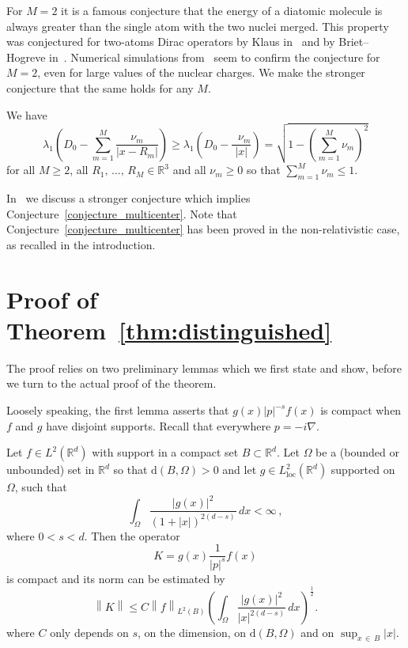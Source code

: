 \documentclass[AHL,Unicode,published]{cedram}
\newcommand{\R}{\mathbb{R}}
\newcommand{\rmd}{\mathrm{d}}
\DeclareMathOperator{\loc}{loc}
\newcommand\1{{\ensuremath {\mathds 1} }}
\newcommand{\ii}{\infty}
\newcommand{\norm}[1]{ \left\| #1 \right\|}
\renewcommand{\geq}{\geqslant}
\renewcommand{\leq}{\leqslant}
\begin{document}
For $M=2$ it is a famous conjecture that the energy of a diatomic molecule is always greater than the single atom with the two nuclei merged. This property was conjectured for two-atoms Dirac operators by Klaus in~\cite[p.~478]{Klaus-80b} and by Briet--Hogreve in~\cite[Section~2.4]{BriHog-03}. Numerical simulations from~\cite{ArtSurIndPluSto-10,McConnell-13} seem to confirm the conjecture for $M=2$, even for large values of the nuclear charges. We make the stronger conjecture that the same holds for any $M$.

\begin{conjecture}\label{conjecture_multicenter}
We have
\begin{equation}
\lambda_1\left(D_0-\sum_{m=1}^M\frac{\nu_m}{\left|x-R_m\right|}\right)\geq \lambda_1\left(D_0-\frac{\mathop{\sum\limits_{m=1}^M}\nu_m}{|x|}\right)=\sqrt{1-\left(\sum_{m=1}^M\nu_m\right)^2}
\end{equation}
for all $M\geq2$, all $R_1,\,\dots,\,R_M\in\R^3$ and all $\nu_m\geq0$ so that $\sum_{m=1}^M\nu_m\leq1$.
\end{conjecture}

In~\cite{EstLewSer-21b} we discuss a stronger conjecture which implies Conjecture~\ref{conjecture_multicenter}. Note that Conjecture~\ref{conjecture_multicenter} has been proved in the non-relativistic case, as recalled in the introduction.



\section{Proof of Theorem~\ref{thm:distinguished}}\label{sec:proof_distinguished}


The proof relies on two preliminary lemmas which we first state and show, before we turn to the actual proof of the theorem.

Loosely speaking, the first lemma asserts that $g(x)|p|^{-s}f(x)$ is compact when $f$ and $g$ have disjoint supports. Recall that everywhere $p=-i\nabla$.

\begin{lemma}\label{lem:compacness-disjoint-supports}
Let $f\in L^2(\R^d)$ with support in a compact set $B\subset\R^d$. Let $\Omega$ be a (bounded or unbounded) set in $\R^d$ so that $\rmd(B,\Omega)>0$ and let $g\in L^2_{\loc}(\R^d)$ supported on $\Omega$, such that
\[
\int_{\Omega}\frac{|g(x)|^2}{(1+|x|)^{2(d-s)}}\,dx<\ii\,,
\]
where $0<s<d$. Then the operator
\[
K=g(x)\frac{1}{|p|^s}f(x)
\]
is compact and its norm can be estimated by
\begin{equation}\label{eq:bound_norm_K}
\norm{K}\leq C\norm{f}_{L^2(B)}\left(\int_{\Omega}\frac{|g(x)|^2}{|x|^{2(d-s)}}\,dx\right)^{\frac12}.
\end{equation}
where $C$ only depends on $s$, on the dimension, on $\rmd(B,\Omega)$ and on $\sup_{x\,\in\,B}|x|$.
\end{lemma}
\end{document}
